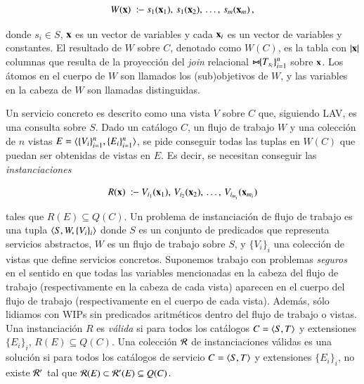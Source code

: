 \[ W(\vvec{x})\ \qrule\ s_1(\vvec{x}_1),\,s_1(\vvec{x}_2),\,\ldots,\,s_m(\vvec{x}_m)\,, \]

donde $s_i\in S$, $\mathbf{x}$ es un vector de variables y cada $\mathbf{x}_i$ es un vector de variables y
constantes. El resultado de $W$ sobre $C$, denotado como $W(C)$, es la tabla con
 $|\mathbf{x}|$ columnas que resulta de la proyección del \emph{join} relacional
$\bowtie\!\!\{T_{s_i}\}_{i=1}^n$ sobre $\mathbf{x}$. Los átomos en el cuerpo de $W$ son llamados los
(sub)objetivos de $W$, y las variables en la cabeza de $W$ son llamadas
distinguidas.

Un servicio concreto es descrito como una vista $V$ sobre $C$ que, siguiendo
LAV, es una consulta sobre $S$. Dado un catálogo $C$, un flujo de trabajo $W$ y
una colección de $n$ vistas $E=\langle \{V_i\}_{i=1}^n,\{E_i\}_{i=1}^n \rangle$, se pide
conseguir todas las tuplas en
$W(C)$ que puedan ser obtenidas de vistas en $E$. Es decir, se necesitan
conseguir las \emph{instanciaciones}

\[ R(\vvec{x})\ \qrule\ V_{i_1}(\vvec{x}_1),\,V_{i_2}(\vvec{x}_2),\,\ldots,\,V_{i_{m_i}}(\vvec{x}_{m_i}) \]

tales que $R(E) \subseteq Q(C)$.
Un problema de instanciación de flujo de trabajo es una
tupla $\langle S,W,\{V_i\}_i \rangle$ donde $S$ es un conjunto de predicados
que representa servicios
abstractos, $W$ es un flujo de trabajo sobre $S$, y $\{V_i\}_i$ una colección de vistas
que define servicios concretos. Suponemos trabajo con problemas \emph{seguros}
en el sentido en que todas las variables mencionadas en la cabeza del flujo de
trabajo (respectivamente en la cabeza de cada vista) aparecen en el cuerpo del
flujo de trabajo (respectivamente en el cuerpo de cada vista). Además, sólo
lidiamos con WIPs sin predicados aritméticos dentro del flujo de trabajo o
vistas. Una instanciación $R$ es \emph{válida} si para todos los catálogos $C=\langle S,T \rangle$ y
extensiones $\{E_i\}_i$, $R(E)\subseteq Q(C)$. Una colección $\mathcal{R}$ de instanciaciones válidas es una
solución si para todos los catálogos de servicio $C=\langle S,T \rangle$ y extensiones $\{E_i\}_i$, no
existe $\mathcal{R}'$ tal que $\mathcal{R}(E)\subset\mathcal{R}'(E)\subseteq Q(C)$.

